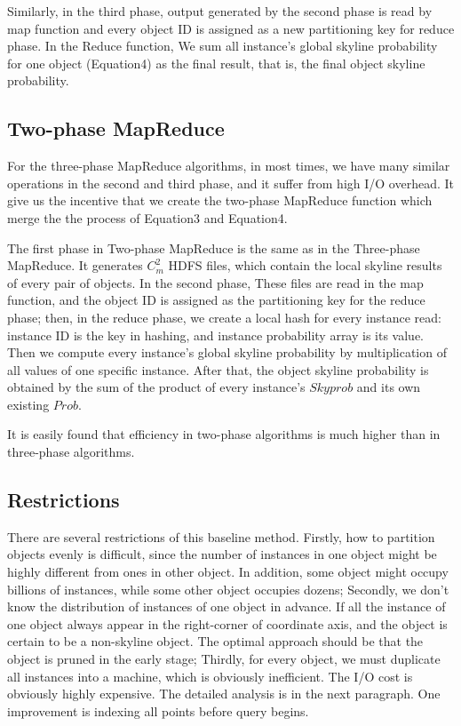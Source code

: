 Similarly, in the third phase, output generated by the second phase is read by map function and every object ID is assigned as a new partitioning key for reduce phase. In the Reduce function, We sum all instance's global skyline probability for one object (Equation4) as the final result, that is, the final object skyline probability.

\subsection{Two-phase MapReduce}
For the three-phase MapReduce algorithms, in most times, we have many similar operations in the second and third phase, and it suffer from high I/O overhead. It give us the incentive that we create the two-phase MapReduce function which merge the the process of Equation3 and Equation4.

The first phase in Two-phase MapReduce is the same as in the Three-phase MapReduce. It generates \(C_{m}^{2}\) HDFS files, which contain the local skyline results of every pair of objects. In the second phase, These files are read in the map function, and the object ID is assigned as the partitioning key for the reduce phase; then, in the reduce phase, we create a local hash for every instance read: instance ID is the key in hashing, and instance probability array is its value. Then we compute every instance's global skyline probability by multiplication of all values of one specific instance. After that, the object skyline probability is obtained by the sum of the product of every instance's \(Skyprob\) and its own existing \(Prob\).

It is easily found that efficiency in two-phase algorithms is much higher than in three-phase algorithms.
\subsection{Restrictions}
There are several restrictions of this baseline method. Firstly, how to partition objects evenly is difficult, since the number of instances in one object might be highly different from ones in other object. In addition, some object might occupy billions of instances, while some other object occupies dozens; Secondly, we don't know the distribution of instances of one object in advance. If all the instance of one object always appear in the right-corner of coordinate axis, and the object is certain to be a non-skyline object. The optimal approach should be that the object is pruned in the early stage; Thirdly, for every object, we must duplicate all instances into a machine, which is obviously inefficient. The I/O cost is obviously highly expensive. The detailed analysis is in the next paragraph. One improvement is indexing all points before query begins.


